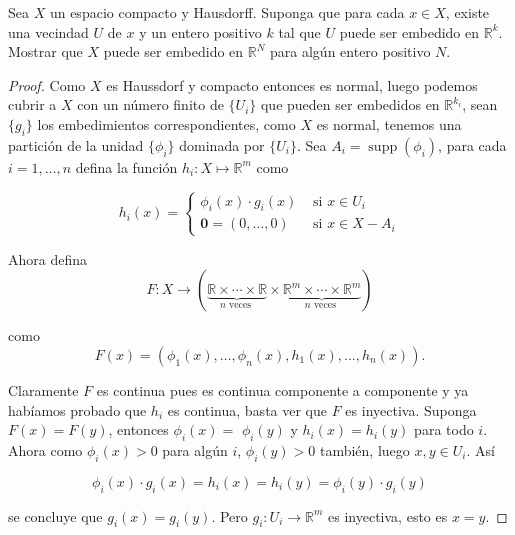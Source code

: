
\item Sea \( X \) un espacio compacto y Hausdorff. Suponga que para cada \( x \in X \), existe una vecindad \( U \) de \( x \) y un entero positivo \( k \) tal que \( U \) puede ser embedido en \( \mathbb{R}^k \). Mostrar que \( X \) puede ser embedido en \( \mathbb{R}^N \) para algún entero positivo \( N \).

\begin{proof}
    Como $X$ es Haussdorf y compacto entonces es normal, luego podemos cubrir a $X$ con un número finito de $\{U_i\}$ que pueden ser embedidos en $\mathbb{R}^{k_i}$, sean $\{g_i\}$ los embedimientos correspondientes, como $X$ es normal, tenemos una partición de la unidad $\{\phi_i\}$ dominada por $\{U_i\}$. Sea $A_i=\operatorname{supp}(\phi_i)$, para cada $i=1,\ldots,n$ defina la función $h_i: X\mapsto \mathbb{R}^m$ como

    $$
h_i(x)= \begin{cases}\phi_i(x) \cdot g_i(x) & \text { si } x \in U_i \\ \mathbf{0}=(0, \ldots, 0) & \text { si } x \in X-A_i\end{cases}
$$

Ahora defina
$$
F: X \longrightarrow(\underbrace{\mathbb{R} \times \cdots \times \mathbb{R}}_{n \text { veces }} \times \underbrace{\mathbb{R}^m \times \cdots \times \mathbb{R}^m}_{n \text { veces }})
$$

como
$$
F(x)=\left(\phi_1(x), \ldots, \phi_n(x), h_1(x), \ldots, h_n(x)\right).
$$

Claramente $F$ es continua pues es continua componente a componente y ya habíamos probado que $h_i$ es continua, basta ver que $F$ es inyectiva. Suponga $F(x)=F(y)$, entonces $\phi_i(x)=$ $\phi_i(y)$ y $h_i(x)=h_i(y)$ para todo $i$. Ahora como $\phi_i(x)>0$ para algún $i$, $\phi_i(y)>0$ también, luego $x, y \in U_i$. Así

$$
\phi_i(x) \cdot g_i(x)=h_i(x)=h_i(y)=\phi_i(y) \cdot g_i(y)
$$


se concluye que $g_i(x)=g_i(y)$. Pero $g_i: U_i \rightarrow \mathbb{R}^m$ es inyectiva, esto es $x=y$.

\end{proof}